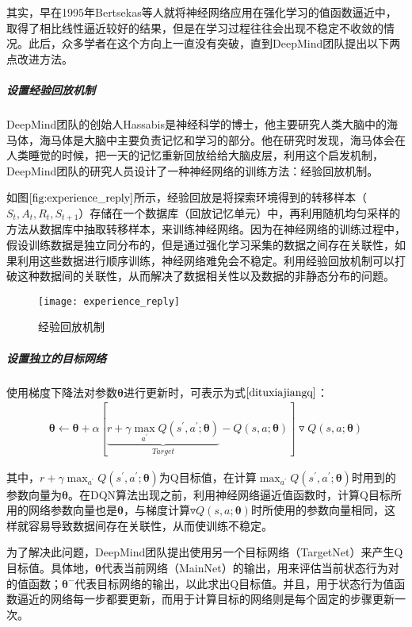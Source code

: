 其实，早在1995年Bertsekas等人就将神经网络应用在强化学习的值函数逼近中，取得了相比线性逼近较好的结果，但是在学习过程往往会出现不稳定不收敛的情况\citep{bertsekas1995neuro}。此后，众多学者在这个方向上一直没有突破，直到DeepMind团队提出以下两点改进方法。

 \subparagraph{设置经验回放机制}
DeepMind团队的创始人Hassabis是神经科学的博士，他主要研究人类大脑中的海马体，海马体是大脑中主要负责记忆和学习的部分。他在研究时发现，海马体会在人类睡觉的时候，把一天的记忆重新回放给给大脑皮层，利用这个启发机制，DeepMind团队的研究人员设计了一种神经网络的训练方法：经验回放机制。

如图$\ref{fig:experience_reply}$所示，经验回放是将探索环境得到的转移样本（$S_{t}, A_{t}, R_{t}, S_{t+1}$）存储在一个数据库（回放记忆单元）中，再利用随机均匀采样的方法从数据库中抽取转移样本，来训练神经网络。因为在神经网络的训练过程中，假设训练数据是独立同分布的，但是通过强化学习采集的数据之间存在关联性，如果利用这些数据进行顺序训练，神经网络难免会不稳定。利用经验回放机制可以打破这种数据间的关联性，从而解决了数据相关性以及数据的非静态分布的问题。
\begin{figure}[htbp]
\centering
\texttt{[image: experience\_reply]}
\caption{经验回放机制}
\label{fig:experience_reply}
\end{figure}

 \subparagraph{设置独立的目标网络}
使用梯度下降法对参数$\bm{\theta}$进行更新时，可表示为式$\eqref{dituxiajiangq}$：
\begin{equation}\label{dituxiajiangq}
\begin{aligned}
\bm{\theta}  \leftarrow \bm{\theta}+\alpha[\underbrace{r+\gamma \max_{a^{'}}Q(s^{'},a^{'};\bm{\theta})}_{Target}-Q(s,a;\bm{\theta})]\triangledown Q(s,a;\bm{\theta})
\end{aligned}
\end{equation}

其中，$r+\gamma \max_{a^{'}}Q(s^{'},a^{'};\bm{\theta})$为Q目标值，在计算$\max_{a^{'}}Q(s^{'},a^{'};\bm{\theta})$时用到的参数向量为$\bm{\theta}$。在DQN算法出现之前，利用神经网络逼近值函数时，计算Q目标所用的网络参数向量也是$\bm{\theta}$，与梯度计算$\triangledown Q(s,a;\bm{\theta})$时所使用的参数向量相同，这样就容易导致数据间存在关联性，从而使训练不稳定。

为了解决此问题，DeepMind团队提出使用另一个目标网络（TargetNet）来产生Q目标值。具体地，$\bm{\theta}$代表当前网络（MainNet）的输出，用来评估当前状态行为对的值函数；$\bm{\theta}^{-}$代表目标网络的输出，以此求出Q目标值。并且，用于状态行为值函数逼近的网络每一步都要更新，而用于计算目标的网络则是每个固定的步骤更新一次。

